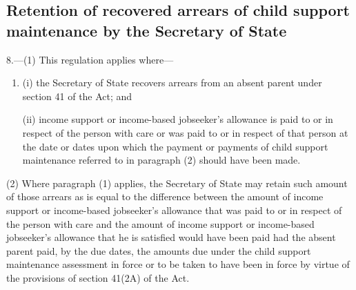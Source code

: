 \documentclass[12pt,a4paper]{article}
\begin{document}
%

\subsection[8. Retention of recovered arrears of child support maintenance by the Secretary of State]{\sloppy Retention of recovered arrears of child support maintenance by the Secretary of State}

8.—(1) This regulation applies where—
\begin{enumerate}\item[]
(i) the Secretary of State recovers arrears from an absent parent under section 41 of the Act; and

(ii) income support
or income-based jobseeker’s allowance  %
is paid to or in respect of the person with care or was paid to or in respect of that person at the date or dates upon which the payment or payments of child support maintenance referred to in paragraph (2) should have been made.
\end{enumerate}

(2) Where paragraph (1) applies, the Secretary of State may retain such amount of those arrears as is equal to the difference between the amount of income support 
or income-based jobseeker’s allowance  %
that was paid to or in respect of the person with care and the amount of income support 
or income-based jobseeker’s allowance  %
that he is satisfied would have been paid had the absent parent paid, by the due dates, the amounts due under the child support maintenance assessment in force or to be taken to have been in force by virtue of the provisions of section 41(2A) of the Act.
\end{document}

